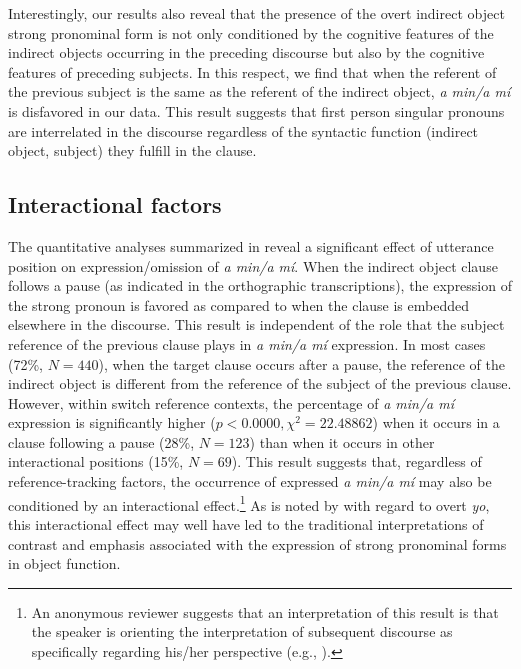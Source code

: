 \documentclass[output=paper]{langscibook}
\begin{document}
Interestingly, our results also reveal that the presence of the overt indirect object strong pronominal form is not only conditioned by the cognitive features of the indirect objects occurring in the preceding discourse but also by the cognitive features of preceding subjects. In this respect, we find that when the referent of the previous subject is the same as the referent of the indirect object, \textit{a min\slash a mí} is disfavored in our data. This result suggests that first person singular pronouns are interrelated in the discourse regardless of the syntactic function (indirect object, subject) they fulfill in the clause. 

\subsection{Interactional factors} 
The quantitative analyses summarized in  reveal a significant effect of utterance position on expression\slash omission of \textit{a min\slash a mí}. When the indirect object clause follows a pause (as indicated in the orthographic transcriptions), the expression of the strong pronoun is favored as compared to when the clause is embedded elsewhere in the discourse. This result is independent of the role that the subject reference of the previous clause plays in \textit{a min\slash a mí} expression. In most cases (72\%, $N=440$), when the target clause occurs after a pause, the reference of the indirect object is different from the reference of the subject of the previous clause. However, within switch reference contexts, the percentage of \textit{a min\slash a mí} expression is significantly higher ($p < 0.0000,\allowbreak \chi^2 = 22.48862$) when it occurs in a clause following a pause (28\%, $N=123$) than when it occurs in other interactional positions (15\%, $N=69$). This result suggests that, regardless of reference-tracking factors, the occurrence of expressed \textit{a min\slash a mí} may also be conditioned by an interactional effect.\footnote{An anonymous reviewer suggests that an interpretation of this result is that the speaker is orienting the interpretation of subsequent discourse as specifically regarding his/her perspective (e.g., \citealt{FauconnierTurner2006}).}  As is noted by \citet[737]{TravisTorresCacoullos2012} with regard to overt \textit{yo}, this interactional effect may well have led to the traditional interpretations of contrast and emphasis associated with the expression of strong pronominal forms in object function. 
\end{document}

